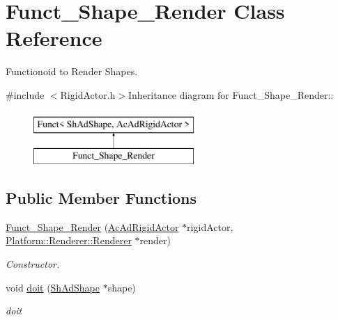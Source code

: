 \hypertarget{classFunct__Shape__Render}{
\section{Funct\_\-Shape\_\-Render Class Reference}
\label{classFunct__Shape__Render}
}


Functionoid to Render Shapes.  


{\ttfamily \#include $<$RigidActor.h$>$}Inheritance diagram for Funct\_\-Shape\_\-Render::\begin{figure}[H]
\begin{center}
\leavevmode
\includegraphics[height=2cm]{classFunct__Shape__Render}
\end{center}
\end{figure}
\subsection*{Public Member Functions}
\begin{DoxyCompactItemize}
\item 
\hypertarget{classFunct__Shape__Render_aec1e7289d4d20b536a3981afceaf9e2e}{
\hyperlink{classFunct__Shape__Render_aec1e7289d4d20b536a3981afceaf9e2e}{Funct\_\-Shape\_\-Render} (\hyperlink{classContent_1_1Actor_1_1Admin_1_1RigidActor}{AcAdRigidActor} $\ast$rigidActor, \hyperlink{classPlatform_1_1Renderer_1_1Renderer}{Platform::Renderer::Renderer} $\ast$render)}
\label{classFunct__Shape__Render_aec1e7289d4d20b536a3981afceaf9e2e}

\begin{DoxyCompactList}\small\item\em Constructor. \item\end{DoxyCompactList}\item 
\hypertarget{classFunct__Shape__Render_a5df74d169a03ab533f50830496cfe3ef}{
void \hyperlink{classFunct__Shape__Render_a5df74d169a03ab533f50830496cfe3ef}{doit} (\hyperlink{classContent_1_1Shape_1_1Admin_1_1Shape}{ShAdShape} $\ast$shape)}
\label{classFunct__Shape__Render_a5df74d169a03ab533f50830496cfe3ef}

\begin{DoxyCompactList}\small\item\em doit \item\end{DoxyCompactList}\end{DoxyCompactItemize}
